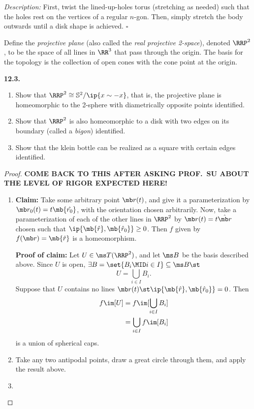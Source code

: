\documentclass{fkbook}
\newenvironment{problem}[1][Problem \thesection.]
{\noindent\begin{boxedminipage}{\linewidth}\textbf{#1.}}
{\end{boxedminipage}}
\begin{document}
\noindent \emph{Description:} First, twist the lined-up-holes torus (stretching
as needed) such that the holes rest on the vertices of a regular $n$-gon. Then,
simply stretch the body outwards until a disk shape is achieved. \hfill $\square$
\begin{definition}
  Define the \emph{projective plane} (also called the \emph{real projective
    2-space}), denoted $\RRP^2$, to be the space of all lines in $\RR^3$ that
  pass through the origin. The basis for the topology is the collection of open
  cones with the cone point at the origin.
\end{definition}
\begin{problem}[12.3]
  \begin{enumerate}
    \item Show that $\RRP^2 \cong \mathbb{S}^2/\ip{x \sim -x}$, that is, the
      projective plane is homeomorphic to the 2-sphere with diametrically
      opposite points identified.
    \item Show that $\RRP^2$ is also homeomorphic to a disk with two edges on
      its boundary (called a \emph{bigon}) identified.
    \item Show that the klein bottle can be realized as a square with certain
      edges identified.
  \end{enumerate}
\end{problem}
\begin{proof}
  \textbf{COME BACK TO THIS AFTER ASKING PROF.\ SU ABOUT THE LEVEL OF RIGOR
    EXPECTED HERE!}
  \begin{enumerate}
    \item \textbf{Claim:} Take some arbitrary point $\mb r(t)$, and give it a
      parameterization by $\mb r_0(t) = t \mb{\hat{r_0}}$, with the orientation
      chosen arbitrarily. Now, take a parameterization of each of the other
      lines in $\RRP^2$ by $\mb r(t) = t \hat{\mb r}$ chosen such that
      $\ip{\mb{\hat r}, \mb{\hat{r}_0}} \geq 0$. Then $f$ given by $f(\mb r) =
      \mb{\hat{r}}$ is a homeomorphism.

      \textbf{Proof of claim:} Let $U \in \ms T(\RRP^2)$, and let $\ms B$ be the
      basis described above. Since $U$ is open, $\exists B = \set{B_i \MID i \in
        I} \subseteq \ms B \st$
      \[
        U = \bigcup_{i \in I} B_i.
      \]
      Suppose that $U$ contains no lines $\mb r(t) \st \ip{\mb{\hat r},
        \mb{\hat{r}_0}} = 0$. Then
      \begin{align*}
        f\im[U]
        &= f\im[\bigcup_{i \in I}B_i] \\
        &= \bigcup_{i \in I} f\im[B_i]
      \end{align*}
      is a union of spherical caps.
    \item Take any two antipodal points, draw a great circle through them, and
      apply the result above.
    \item
  \end{enumerate}
\end{proof}
\end{document}
